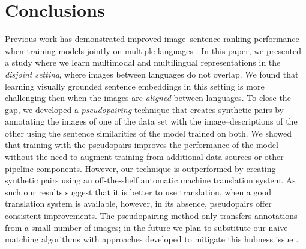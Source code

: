 \section{Conclusions}

Previous work has demonstrated improved image--sentence ranking performance
when training models jointly on multiple languages \citep{gella2017image, kadar2018conll}. In this paper, we presented a study where we learn multimodal
and multilingual representations in the \emph{disjoint setting}, where
images between languages do not overlap.
We found that learning visually grounded sentence embeddings in this
setting is more challenging then when the images are \emph{aligned}
between languages. To close the gap, we developed a \emph{pseudopairing} technique  that creates synthetic pairs by annotating the images
of one of the data set with the image--descriptions of the other using the
sentence similarities of the model trained on both. We showed that 
training with the pseudopairs improves the performance of the model
without the need to augment training from additional data sources or 
other pipeline components. However, our technique is outperformed
by creating synthetic pairs using an off-the-shelf automatic machine translation system. As such our results suggest that it is better to use translation,
when a good translation system is available, however, in its absence, pseudopairs
offer consistent improvements. The pseudopairing method only transfers annotations from a small number of images; in the future we plan to substitute our naive matching algorithms
with approaches developed to mitigate this hubness issue \citep{radovanovic2010existence}.%